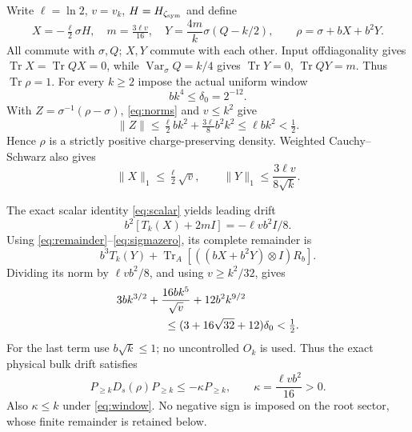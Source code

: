 \documentclass[11pt]{article}
\newcommand{\Tr}{\operatorname{Tr}}
\newcommand{\norm}[1]{\lVert #1\rVert}
\begin{document}
Write $\ell=\ln2$, $v=v_k$, $H=H_{\zeta_{\rm sym}}$ and define
\begin{equation}\label{eq:actualrho}
 X=-\tfrac\ell2\sigma H,\quad m=\tfrac{3\ell v}{16},\quad
 Y=\frac{4m}{k}\sigma(Q-k/2),\qquad
 \rho=\sigma+bX+b^2Y.
\end{equation}
All commute with $\sigma,Q$; $X,Y$ commute with each other.
Input offdiagonality gives $\Tr X=\Tr QX=0$, while
$\operatorname{Var}_\sigma Q=k/4$ gives $\Tr Y=0$, $\Tr QY=m$.
Thus $\Tr\rho=1$.
For every $k\ge2$ impose the actual uniform window
\begin{equation}\label{eq:window}
 bk^4\le\delta_0=2^{-12}.
\end{equation}
With $Z=\sigma^{-1}(\rho-\sigma)$, \eqref{eq:norms} and $v\le k^2$
give
\begin{equation}\label{eq:Z}
 \norm Z\le\tfrac\ell2 bk^2+\tfrac{3\ell}{8}b^2k^2
          \le\ell bk^2<\tfrac12.
\end{equation}
Hence $\rho$ is a strictly positive charge-preserving density.
Weighted Cauchy--Schwarz also gives
\begin{equation}\label{eq:tracebounds}
 \norm X_1\le\tfrac\ell2\sqrt v,\qquad
 \norm Y_1\le\frac{3\ell v}{8\sqrt k}.
\end{equation}

The exact scalar identity \eqref{eq:scalar} yields leading drift
\[
 b^2[T_k(X)+2mI]=-\ell v b^2 I/8.
\]
Using \eqref{eq:remainder}--\eqref{eq:sigmazero}, its complete remainder is
\[
 b^3T_k(Y)+\Tr_A[((bX+b^2Y)\otimes I)R_b].
\]
Dividing its norm by $\ell vb^2/8$, and using
$v\ge k^2/32$, gives
\begin{align}
 &3bk^{3/2}+\frac{16bk^5}{\sqrt v}+12b^2k^{9/2}\notag\\
 &\hspace{15mm}\le(3+16\sqrt{32}+12)\delta_0<\tfrac12.\label{eq:relative}
\end{align}
For the last term use $b\sqrt k\le1$; no uncontrolled $O_k$ is used.
Thus the exact physical bulk drift satisfies
\begin{equation}\label{eq:exactdrift}
 P_{\ge k}D_s(\rho)P_{\ge k}\le-\kappa P_{\ge k},
 \qquad\kappa=\frac{\ell vb^2}{16}>0.
\end{equation}
Also $\kappa\le k$ under \eqref{eq:window}. No negative sign is imposed
on the root sector, whose finite remainder is retained below.
\end{document}
